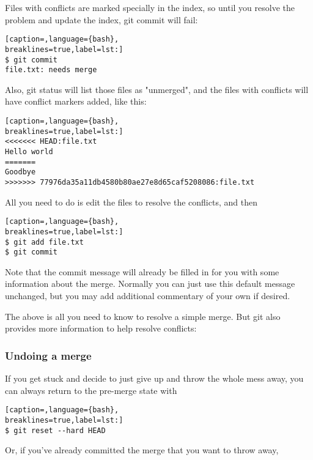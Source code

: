 Files with conflicts are marked specially in the index, so until you resolve
the problem and update the index, git commit will fail:

\lstset{basicstyle=\scriptsize, numbers=none, captionpos=b, tabsize=4}
\begin{lstlisting}[caption=,language={bash},
breaklines=true,label=lst:]
$ git commit
file.txt: needs merge
\end{lstlisting}

Also, git status will list those files as "unmerged", and the files with
conflicts will have conflict markers added, like this:

\lstset{basicstyle=\scriptsize, numbers=none, captionpos=b, tabsize=4}
\begin{lstlisting}[caption=,language={bash},
breaklines=true,label=lst:]
<<<<<<< HEAD:file.txt
Hello world
=======
Goodbye
>>>>>>> 77976da35a11db4580b80ae27e8d65caf5208086:file.txt
\end{lstlisting}

All you need to do is edit the files to resolve the conflicts, and then

\lstset{basicstyle=\scriptsize, numbers=none, captionpos=b, tabsize=4}
\begin{lstlisting}[caption=,language={bash},
breaklines=true,label=lst:]
$ git add file.txt
$ git commit
\end{lstlisting}

Note that the commit message will already be filled in for you with some
information about the merge. Normally you can just use this default message
unchanged, but you may add additional commentary of your own if desired.

The above is all you need to know to resolve a simple merge. But git also
provides more information to help resolve conflicts:

\subsubsection{Undoing a merge}
If you get stuck and decide to just give up and throw the whole mess away, you
can always return to the pre-merge state with

\lstset{basicstyle=\scriptsize, numbers=none, captionpos=b, tabsize=4}
\begin{lstlisting}[caption=,language={bash},
breaklines=true,label=lst:]
$ git reset --hard HEAD
\end{lstlisting}

Or, if you've already committed the merge that you want to throw away,


